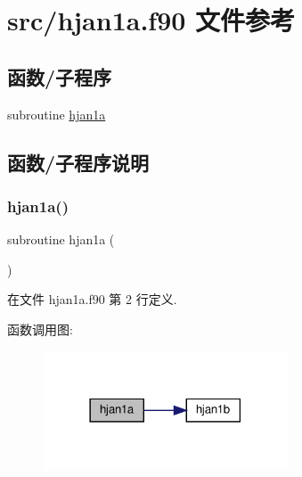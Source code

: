 \hypertarget{hjan1a_8f90}{}\section{src/hjan1a.f90 文件参考}
\label{hjan1a_8f90}
\subsection*{函数/子程序}
\begin{DoxyCompactItemize}
\item 
subroutine \mbox{\hyperlink{hjan1a_8f90_a14eb25c78f2e7638c832fe6674cbb3d3}{hjan1a}}
\end{DoxyCompactItemize}


\subsection{函数/子程序说明}
\mbox{\label{hjan1a_8f90_a14eb25c78f2e7638c832fe6674cbb3d3}} 
\subsubsection{\texorpdfstring{hjan1a()}{hjan1a()}}
{\footnotesize\ttfamily subroutine hjan1a (\begin{DoxyParamCaption}{ }\end{DoxyParamCaption})}



在文件 hjan1a.\+f90 第 2 行定义.

函数调用图\+:
\nopagebreak
\begin{figure}[H]
\begin{center}
\leavevmode
\includegraphics[width=206pt]{hjan1a_8f90_a14eb25c78f2e7638c832fe6674cbb3d3_cgraph}
\end{center}
\end{figure}
